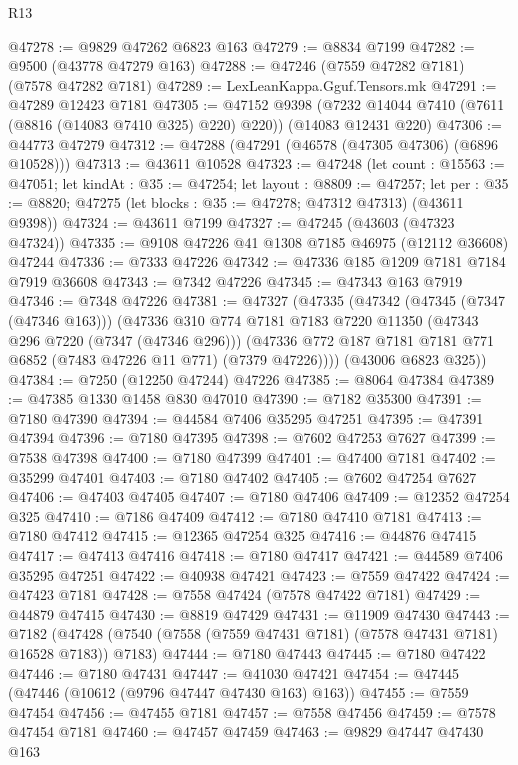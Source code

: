 \begin{lexlean}{R13}
\begin{coremodule}
@47278 := @9829 @47262 @6823 @163
@47279 := @8834 @7199
@47282 := @9500 (@43778 @47279 @163)
@47288 := @47246 (@7559 @47282 @7181) (@7578 @47282 @7181)
@47289 := LexLeanKappa.Gguf.Tensors.mk
@47291 := @47289 @12423 @7181
@47305 := @47152
    @9398
    (@7232 @14044 @7410 (@7611 (@8816 (@14083 @7410 @325) @220) @220))
    (@14083 @12431 @220)
@47306 := @44773 @47279
@47312 := @47288 (@47291 (@46578 (@47305 @47306) (@6896 @10528)))
@47313 := @43611 @10528
@47323 := @47248
    (let count : @15563 := @47051;
    let kindAt : @35 := @47254;
    let layout : @8809 := @47257;
    let per : @35 := @8820; @47275 (let blocks : @35 := @47278; @47312 @47313) (@43611 @9398))
@47324 := @43611 @7199
@47327 := @47245 (@43603 (@47323 @47324))
@47335 := @9108 @47226 @41 @1308 @7185 @46975 (@12112 @36608) @47244
@47336 := @7333 @47226
@47342 := @47336 @185 @1209 @7181 @7184 @7919 @36608
@47343 := @7342 @47226
@47345 := @47343 @163 @7919
@47346 := @7348 @47226
@47381 := @47327
    (@47335
      (@47342
        (@47345 (@7347 (@47346 @163)))
        (@47336
          @310
          @774
          @7181
          @7183
          @7220
          @11350
          (@47343 @296 @7220 (@7347 (@47346 @296)))
          (@47336 @772 @187 @7181 @7181 @771 @6852 (@7483 @47226 @11 @771) (@7379 @47226))))
      (@43006 @6823 @325))
@47384 := @7250 (@12250 @47244) @47226
@47385 := @8064 @47384
@47389 := @47385 @1330 @1458 @830 @47010
@47390 := @7182 @35300
@47391 := @7180 @47390
@47394 := @44584 @7406 @35295 @47251
@47395 := @47391 @47394
@47396 := @7180 @47395
@47398 := @7602 @47253 @7627
@47399 := @7538 @47398
@47400 := @7180 @47399
@47401 := @47400 @7181
@47402 := @35299 @47401
@47403 := @7180 @47402
@47405 := @7602 @47254 @7627
@47406 := @47403 @47405
@47407 := @7180 @47406
@47409 := @12352 @47254 @325
@47410 := @7186 @47409
@47412 := @7180 @47410 @7181
@47413 := @7180 @47412
@47415 := @12365 @47254 @325
@47416 := @44876 @47415
@47417 := @47413 @47416
@47418 := @7180 @47417
@47421 := @44589 @7406 @35295 @47251
@47422 := @40938 @47421
@47423 := @7559 @47422
@47424 := @47423 @7181
@47428 := @7558 @47424 (@7578 @47422 @7181)
@47429 := @44879 @47415
@47430 := @8819 @47429
@47431 := @11909 @47430
@47443 := @7182
    (@47428 (@7540 (@7558 (@7559 @47431 @7181) (@7578 @47431 @7181) @16528 @7183)) @7183)
@47444 := @7180 @47443
@47445 := @7180 @47422
@47446 := @7180 @47431
@47447 := @41030 @47421
@47454 := @47445 (@47446 (@10612 (@9796 @47447 @47430 @163) @163))
@47455 := @7559 @47454
@47456 := @47455 @7181
@47457 := @7558 @47456
@47459 := @7578 @47454 @7181
@47460 := @47457 @47459
@47463 := @9829 @47447 @47430 @163

\end{coremodule}
\end{lexlean}
